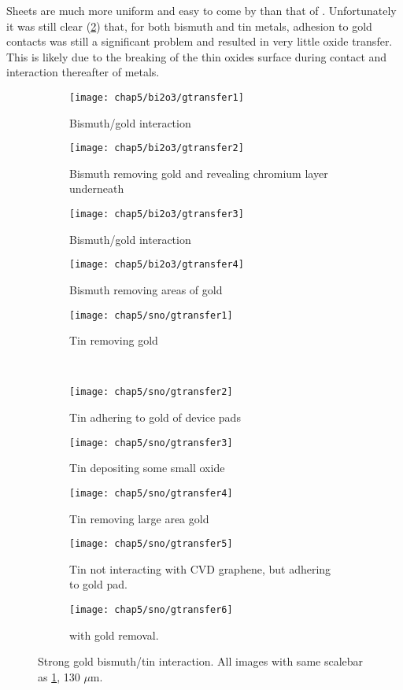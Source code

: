 \documentclass[../Matt_Gebert_Honours_Thesis.tex]{subfiles}
\begin{document}
	Sheets are much more uniform and easy to come by than that of \aluminimumoxide{}. Unfortunately it was still clear (\cref{fig:goldbismuthtin}) that, for both bismuth and tin metals, adhesion to gold contacts was still a significant problem and resulted in very little oxide transfer. This is likely due to the breaking of the thin oxides surface during contact and interaction thereafter of metals.
	\begin{figure}[H]
		\centering
		\begin{subfigure}[t]{0.19\textwidth}
			\texttt{[image: chap5/bi2o3/gtransfer1]}
			\caption{Bismuth/gold interaction}\label{fig:goldbistin1}
		\end{subfigure}
		\begin{subfigure}[t]{0.19\textwidth}
			\texttt{[image: chap5/bi2o3/gtransfer2]}			
			\caption{Bismuth removing gold and revealing chromium layer underneath}
		\end{subfigure}
		\begin{subfigure}[t]{0.19\textwidth}
			\texttt{[image: chap5/bi2o3/gtransfer3]}
			\caption{Bismuth/gold interaction}
		\end{subfigure}
		\begin{subfigure}[t]{0.19\textwidth}
			\texttt{[image: chap5/bi2o3/gtransfer4]}
			\caption{Bismuth removing areas of gold}
		\end{subfigure}
		\begin{subfigure}[t]{0.19\textwidth}
			\texttt{[image: chap5/sno/gtransfer1]}
			\caption{Tin removing gold}
		\end{subfigure}\\
		\begin{subfigure}[t]{0.19\textwidth}
			\texttt{[image: chap5/sno/gtransfer2]}
			\caption{Tin adhering to gold of device pads}
		\end{subfigure}
		\begin{subfigure}[t]{0.19\textwidth}
			\texttt{[image: chap5/sno/gtransfer3]}
			\caption{Tin depositing some small oxide}
		\end{subfigure}
		\begin{subfigure}[t]{0.19\textwidth}
			\texttt{[image: chap5/sno/gtransfer4]}
			\caption{Tin removing large area gold}
		\end{subfigure}
		\begin{subfigure}[t]{0.19\textwidth}
			\texttt{[image: chap5/sno/gtransfer5]}
			\caption{Tin not interacting with CVD graphene, but adhering to gold pad.}
		\end{subfigure}
		\begin{subfigure}[t]{0.19\textwidth}
			\texttt{[image: chap5/sno/gtransfer6]}
			\caption{\tinoxide{} with gold removal.}
		\end{subfigure}
		\caption[Strong gold bismuth/tin interaction]{Strong gold bismuth/tin interaction. All images with same scalebar as \cref{fig:goldbistin1}, 130 $\mu$m.}\label{fig:goldbismuthtin}
	\end{figure}
	
\end{document}
